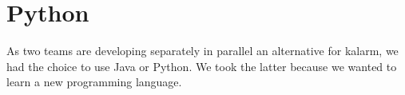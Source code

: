 \section{Python}
As two teams are developing separately in parallel an alternative for \gls{kalarm}, we had the choice to use Java or Python. We took the latter because we wanted to learn a new programming language.